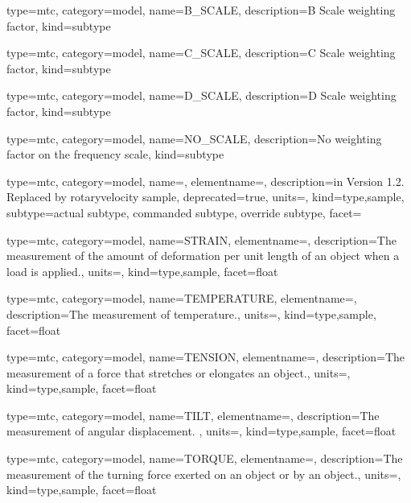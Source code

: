 {
  type=mtc,
  category=model,
  name={B\_SCALE},
  description={B Scale weighting factor},
  kind={subtype}
}


{
  type=mtc,
  category=model,
  name={C\_SCALE},
  description={C Scale weighting factor},
  kind={subtype}
}


{
  type=mtc,
  category=model,
  name={D\_SCALE},
  description={D Scale weighting factor},
  kind={subtype}
}


{
  type=mtc,
  category=model,
  name={NO\_SCALE},
  description={No weighting factor on the frequency scale},
  kind={subtype}
}


{
  type=mtc,
  category=model,
  name={},
  elementname=,
  description={\DEPRECATED in Version 1.2.  Replaced by \gls{rotaryvelocity sample}},
  deprecated={true},
  units={},
  kind={type,sample},
  subtype={\gls{actual subtype}, \gls{commanded subtype}, \gls{override subtype}},
  facet={}
}



{
  type=mtc,
  category=model,
  name={STRAIN},
  elementname=,
  description={The measurement of the amount of deformation per unit length of an object when a load is applied.},
  units=,
  kind={type,sample},
  facet={\gls{float}}
}


{
  type=mtc,
  category=model,
  name={TEMPERATURE},
  elementname=,
  description={The measurement of temperature.},
  units=,
  kind={type,sample},
  facet={\gls{float}}
}


{
  type=mtc,
  category=model,
  name={TENSION},
  elementname=,
  description={The measurement of a force that stretches or elongates an object.},
  units=,
  kind={type,sample},
  facet={\gls{float}}
}


{
  type=mtc,
  category=model,
  name={TILT},
  elementname=,
  description={The measurement of angular displacement. },
  units=,
  kind={type,sample},
  facet={\gls{float}}
}


{
  type=mtc,
  category=model,
  name={TORQUE},
  elementname=,
  description={The measurement of the turning force exerted on an object or by an object.},
  units=,
  kind={type,sample},
  facet={\gls{float}}
}



